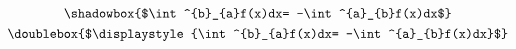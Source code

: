 \documentclass{book}
\begin{document}
\setcounter{chapter}{2}

\begin{gather}
\shadowbox{$\int^{b}_{a}f(x)dx=
-\int^{a}_{b}f(x)dx$}\\
\doublebox{$\displaystyle{%
\int^{b}_{a}f(x)dx=
-\int^{a}_{b}f(x)dx}$}
\end{gather}
\end{document}
